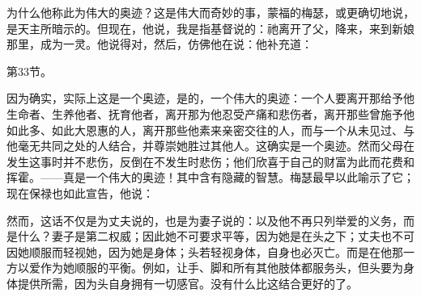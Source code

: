 为什么他称此为伟大的奥迹？这是伟大而奇妙的事，蒙福的梅瑟，或更确切地说，是天主所暗示的。但现在，他说，我是指基督说的：祂离开了父，降来，来到新娘那里，成为一灵。他说得对，然后，仿佛他在说：他补充道：\newline{}\par

第33节。\newline{}\par

因为确实，实际上这是一个奥迹，是的，一个伟大的奥迹：一个人要离开那给予他生命者、生养他者、抚育他者，离开那为他忍受产痛和悲伤者，离开那些曾施予他如此多、如此大恩惠的人，离开那些他素来亲密交往的人，而与一个从未见过、与他毫无共同之处的人结合，并尊崇她胜过其他人。这确实是一个奥迹。然而父母在发生这事时并不悲伤，反倒在不发生时悲伤；他们欣喜于自己的财富为此而花费和挥霍。——真是一个伟大的奥迹！其中含有隐藏的智慧。梅瑟最早以此喻示了它；现在保禄也如此宣告，他说：\newline{}\par

然而，这话不仅是为丈夫说的，也是为妻子说的：以及他不再只列举爱的义务，而是什么？妻子是第二权威；因此她不可要求平等，因为她是在头之下；丈夫也不可因她顺服而轻视她，因为她是身体；头若轻视身体，自身也必灭亡。而是在他那一方以爱作为她顺服的平衡。例如，让手、脚和所有其他肢体都服务头，但头要为身体提供所需，因为头自身拥有一切感官。没有什么比这结合更好的了。\newline{}\par

